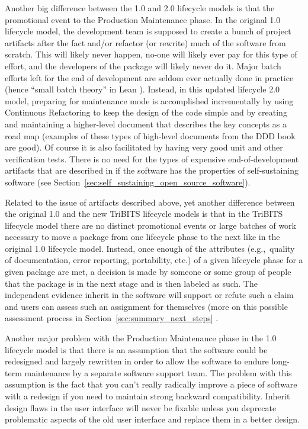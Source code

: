 \documentclass[11pt]{SANDreport}
\begin{document}
Another big difference between the 1.0 and 2.0 lifecycle models is
that the promotional event to the Production Maintenance phase.  In
the original 1.0 lifecycle model, the development team is supposed to
create a bunch of project artifacts after the fact and/or refactor (or
rewrite) much of the software from scratch.  This will likely never
happen, no-one will likely ever pay for this type of effort, and the
developers of the package will likely never do it.  Major batch
efforts left for the end of development are seldom ever actually done
in practice (hence ``small batch theory'' in Lean
{}\cite{ImplementingLeanSoftwareDevelopment}).  Instead, in this
updated lifecycle 2.0 model, preparing for maintenance mode is
accomplished incrementally by using Continuous Refactoring to keep
the design of the code simple and by creating and maintaining a
higher-level document that describes the key concepts as a road map
(examples of these types of high-level documents from the DDD book are
good).  Of course it is also facilitated by having very good unit and
other verification tests.  There is no need for the types of expensive
end-of-development artifacts that are described in
{}\cite{TrilinosLifecycleModel2007} if the software has the properties
of self-sustaining software (see
Section~\ref{sec:self_sustaining_open_source_software}).

Related to the issue of artifacts described above, yet another
difference between the original 1.0 and the new TriBITS lifecycle
models is that in the TriBITS lifecycle model there are no distinct
promotional events or large batches of work necessary to move a
package from one lifecycle phase to the next like in the original 1.0
lifecycle model.  Instead, once enough of the attributes (e.g.,\
quality of documentation, error reporting, portability, etc.) of a
given lifecycle phase for a given package are met, a decision is made
by someone or some group of people that the package is in the next
stage and is then labeled as such.  The independent evidence inherit
in the software will support or refute such a claim and users can
assess such an assignment for themselves (more on this possible
assessment process in Section~\ref{sec:summary_next_steps} .

Another major problem with the Production Maintenance phase in the 1.0
lifecycle model is that there is an assumption that the software could
be redesigned and largely rewritten in order to allow the software to
endure long-term maintenance by a separate software support team.  The
problem with this assumption is the fact that you can't really
radically improve a piece of software with a redesign if you need to
maintain strong backward compatibility.  Inherit design flaws in the
user interface will never be fixable unless you deprecate problematic
aspects of the old user interface and replace them in a better design.
\end{document}
